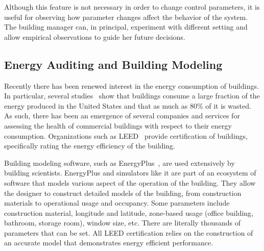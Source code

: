 Although this feature is not necessary in order to change control parameters, it is useful for observing how parameter changes
affect the behavior of the system.  The building manager can, in principal, experiment with different setting and allow
empirical observations to guide her future decisions.



\subsection{Energy Auditing and Building Modeling}
\label{sec:elensvision}
Recently there has been renewed interest in the energy consumption of buildings.  In particular, several studies~\cite{BuildingEnergyData,
MITBuildingScience} show that buildings consume a large fraction of the energy produced in the United States and that as much
as 80\% of it is wasted\cite{waste_science, next10_waste}.  As such, there has been an emergence of several companies and 
services for assessing the health of
commercial buildings with respect to their energy consumption.  Organizations such as LEED~\cite{Leed} provide certification of 
buildings, specifically rating the energy efficiency of the building.

Building modeling software, such as EnergyPlus~\cite{eplus}, are used extensively by building scientists. 
EnergyPlus and simulators like it are part of an ecosystem of software that models various aspect of the operation
of the building.  They allow the designer to construct detailed models of the building, from construction materials to 
operational usage and occupancy.  Some parameters include
construction material, longitude and latitude, zone-based usage (office building, bathroom, storage room), window size, etc.  
There are literally thousands of parameters that can be set.  All LEED certification relies on the construction of an 
accurate model that demonstrates energy efficient performance.

